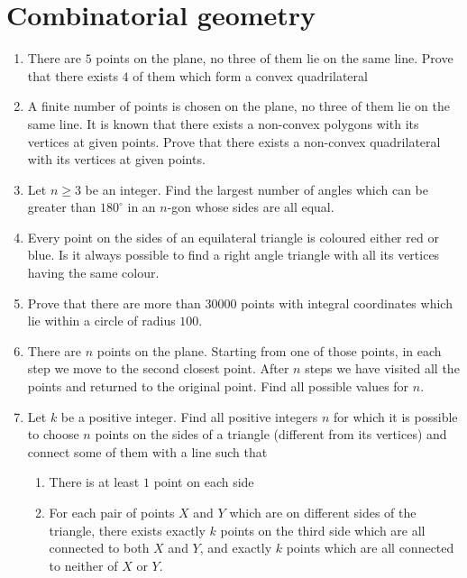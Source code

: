 \documentclass{article}
\begin{document}
\section*{Combinatorial geometry}
	\begin{enumerate}
		\item %
		There are $5$ points on the plane, no three of them lie on the same line. Prove that there exists $4$ of them which form a convex quadrilateral
		\item %
		A finite number of points is chosen on the plane, no three of them lie on the same line. It is known that there exists a non-convex polygons with its vertices at given points. Prove that there exists a non-convex quadrilateral with its vertices at given points.
		\item %
		Let $n \geq 3$ be an integer. Find the largest number of angles which can be greater than $180^\circ$ in an $n$-gon whose sides are all equal.
		\item %
		Every point on the sides of an equilateral triangle is coloured either red or blue. Is it always possible to find a right angle triangle with all its vertices having the same colour.
		\item %
		Prove that there are more than $30000$ points with integral coordinates which lie within a circle of radius $100$.
		\item %
		There are $n$ points on the plane. Starting from one of those points, in each step we move to the second closest point. After $n$ steps we have visited all the points and returned to the original point. Find all possible values for $n$.
		\item %
		Let $k$ be a positive integer. Find all positive integers $n$ for which it is possible to choose $n$ points on the sides of a triangle (different from its vertices) and connect some of them with a line such that
		\begin{enumerate}
			\item There is at least $1$ point on each side
			\item For each pair of points $X$ and $Y$ which are on different sides of the triangle, there exists exactly $k$ points on the third side which are all connected to both $X$ and $Y$, and exactly $k$ points which are all connected to neither of $X$ or $Y$.
		\end{enumerate}

  \end{enumerate}
\end{document}
